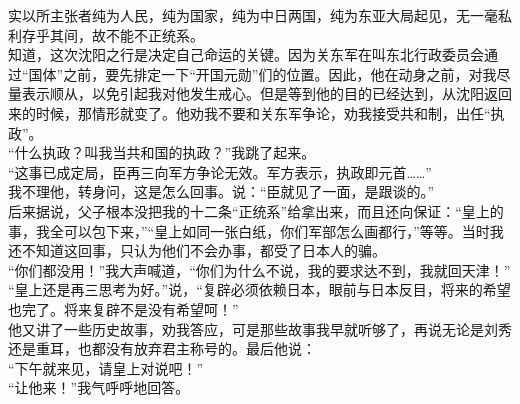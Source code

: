 实以所主张者纯为人民，纯为国家，纯为中日两国，纯为东亚大局起见，无一毫私利存乎其间，故不能不正统系。\\

知道，这次沈阳之行是决定自己命运的关键。因为关东军在叫东北行政委员会通过“国体”之前，要先排定一下“开国元勋”们的位置。因此，他在动身之前，对我尽量表示顺从，以免引起我对他发生戒心。但是等到他的目的已经达到，从沈阳返回来的时候，那情形就变了。他劝我不要和关东军争论，劝我接受共和制，出任“执政”。\\

“什么执政？叫我当共和国的执政？”我跳了起来。\\

“这事已成定局，臣再三向军方争论无效。军方表示，执政即元首……”\\

我不理他，转身问，这是怎么回事。说：“臣就见了一面，是跟谈的。”\\

后来据说，父子根本没把我的十二条“正统系”给拿出来，而且还向保证：“皇上的事，我全可以包下来，”“皇上如同一张白纸，你们军部怎么画都行，”等等。当时我还不知道这回事，只认为他们不会办事，都受了日本人的骗。\\

“你们都没用！”我大声喊道，“你们为什么不说，我的要求达不到，我就回天津！”\\

“皇上还是再三思考为好。”说，“复辟必须依赖日本，眼前与日本反目，将来的希望也完了。将来复辟不是没有希望呵！”\\

他又讲了一些历史故事，劝我答应，可是那些故事我早就听够了，再说无论是刘秀还是重耳，也都没有放弃君主称号的。最后他说：\\

“下午就来见，请皇上对说吧！”\\

“让他来！”我气呼呼地回答。